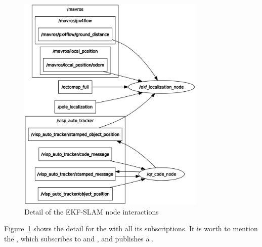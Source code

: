 \begin{figure}[h]
    \centering
    \includegraphics[width=0.8\textwidth]{Figures/fig12-rosgraph_ekf_node}
    \caption[Detail of the EKF-SLAM node interactions]{Detail of the EKF-SLAM node interactions}
    \label{fig:chapter2:architecture:nodes:ekf_node}
\end{figure}

Figure~\ref{fig:chapter2:architecture:nodes:ekf_node} shows the detail for the  with all its subscriptions. It is worth to mention the , which subscribes to  and , and publishes a .





















